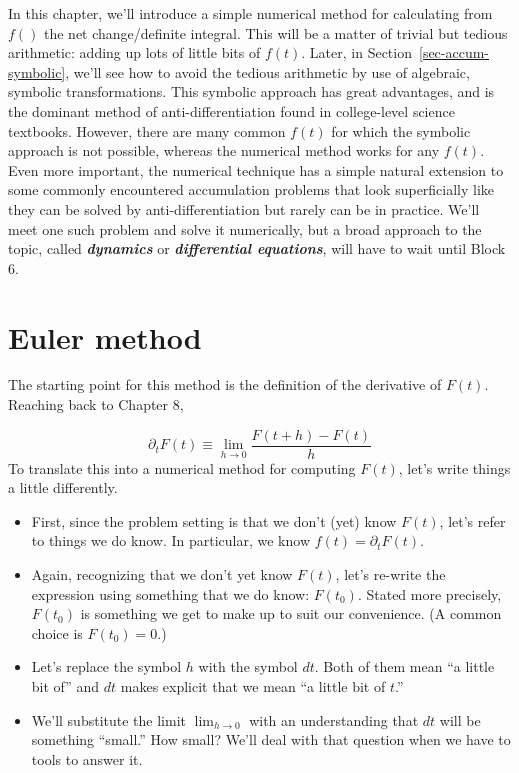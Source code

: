 \documentclass[
  letterpaper,
  DIV=11,
  numbers=noendperiod,
  oneside]{scrreprt}
\providecommand{\tightlist}{%
  \setlength{\itemsep}{0pt}\setlength{\parskip}{0pt}}
\begin{document}
In this chapter, we'll introduce a simple numerical method for
calculating from \(f()\) the net change/definite integral. This will be
a matter of trivial but tedious arithmetic: adding up lots of little
bits of \(f(t)\). Later, in Section~\ref{sec-accum-symbolic}, we'll see
how to avoid the tedious arithmetic by use of algebraic, symbolic
transformations. This symbolic approach has great advantages, and is the
dominant method of anti-differentiation found in college-level science
textbooks. However, there are many common \(f(t)\) for which the
symbolic approach is not possible, whereas the numerical method works
for any \(f(t)\). Even more important, the numerical technique has a
simple natural extension to some commonly encountered accumulation
problems that look superficially like they can be solved by
anti-differentiation but rarely can be in practice. We'll meet one such
problem and solve it numerically, but a broad approach to the topic,
called \textbf{\emph{dynamics}} or \textbf{\emph{differential
equations}}, will have to wait until Block 6.

\hypertarget{euler-method}{%
\section{Euler method}\label{euler-method}}

The starting point for this method is the definition of the derivative
of \(F(t)\). Reaching back to Chapter 8,

\[\partial_t F(t) \equiv \lim_{h\rightarrow 0} \frac{F(t+h) - F(t)}{h}\]
To translate this into a numerical method for computing \(F(t)\), let's
write things a little differently.

\begin{itemize}
\tightlist
\item
  First, since the problem setting is that we don't (yet) know \(F(t)\),
  let's refer to things we do know. In particular, we know
  \(f(t) = \partial_t F(t)\).
\item
  Again, recognizing that we don't yet know \(F(t)\), let's re-write the
  expression using something that we do know: \(F(t_0)\). Stated more
  precisely, \(F(t_0)\) is something we get to make up to suit our
  convenience. (A common choice is \(F(t_0)=0\).)
\item
  Let's replace the symbol \(h\) with the symbol \(dt\). Both of them
  mean ``a little bit of'' and \(dt\) makes explicit that we mean ``a
  little bit of \(t\).''
\item
  We'll substitute the limit \(\lim_{h\rightarrow 0}\) with an
  understanding that \(dt\) will be something ``small.'' How small?
  We'll deal with that question when we have to tools to answer it.
\end{itemize}
\end{document}
